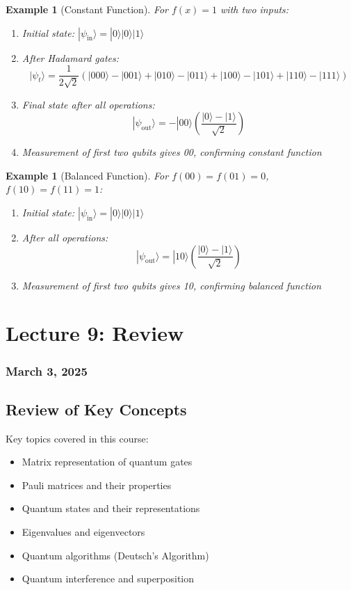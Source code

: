 \documentclass{article}
\newtheorem{example}[theorem]{Example}
\begin{document}
\begin{example}[Constant Function]
For $f(x) = 1$ with two inputs:
\begin{enumerate}
    \item Initial state: $|\psi_{\text{in}}\rangle = |0\rangle|0\rangle|1\rangle$
    \item After Hadamard gates:
    \[
    |\psi_t\rangle = \frac{1}{2\sqrt{2}}(|000\rangle - |001\rangle + |010\rangle - |011\rangle + |100\rangle - |101\rangle + |110\rangle - |111\rangle)
    \]
    \item Final state after all operations:
    \[
    |\psi_{\text{out}}\rangle = -|00\rangle\left(\frac{|0\rangle - |1\rangle}{\sqrt{2}}\right)
    \]
    \item Measurement of first two qubits gives 00, confirming constant function
\end{enumerate}
\end{example}

\begin{example}[Balanced Function]
For $f(00) = f(01) = 0$, $f(10) = f(11) = 1$:
\begin{enumerate}
    \item Initial state: $|\psi_{\text{in}}\rangle = |0\rangle|0\rangle|1\rangle$
    \item After all operations:
    \[
    |\psi_{\text{out}}\rangle = |10\rangle\left(\frac{|0\rangle - |1\rangle}{\sqrt{2}}\right)
    \]
    \item Measurement of first two qubits gives 10, confirming balanced function
\end{enumerate}
\end{example}

\newpage
\section{Lecture 9: Review}
\subsubsection*{March 3, 2025}

\subsection{Review of Key Concepts}
\begin{conceptbox}
Key topics covered in this course:
\begin{itemize}
    \item Matrix representation of quantum gates
    \item Pauli matrices and their properties
    \item Quantum states and their representations
    \item Eigenvalues and eigenvectors
    \item Quantum algorithms (Deutsch's Algorithm)
    \item Quantum interference and superposition
\end{itemize}
\end{conceptbox}
\end{document}
